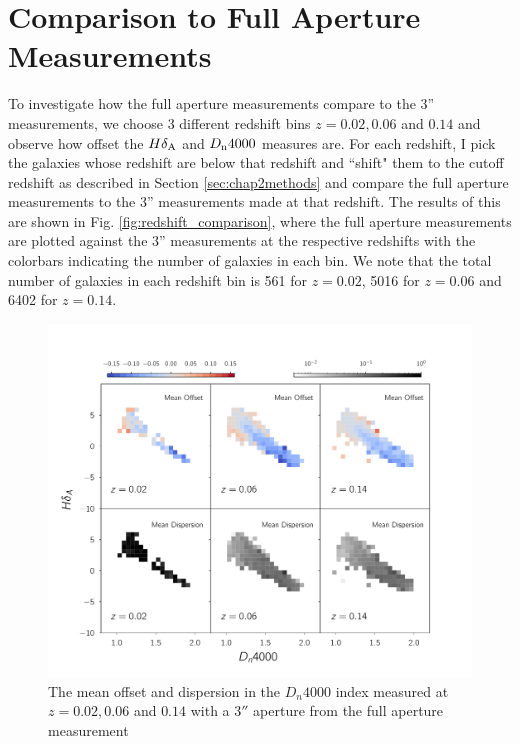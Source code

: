 \section{Comparison to Full Aperture Measurements}
To investigate how the full aperture measurements compare to the 3'' measurements, we choose 3 different redshift bins $z = 0.02,0.06$ and $0.14$ and observe how offset the $H\delta_{\rm A}$ and $D_{\rm n}4000$ measures are. For each redshift, I pick the galaxies whose redshift are below that redshift and ``shift" them to the cutoff redshift as described in Section \ref{sec:chap2methods} and compare the full aperture measurements to the 3'' measurements made at that redshift. The results of this are shown in Fig. \ref{fig:redshift_comparison}, where the full aperture measurements are plotted against the 3'' measurements at the respective redshifts with the colorbars indicating the number of galaxies in each bin. We note that the total number of galaxies in each redshift bin is 561 for $z = 0.02$, 5016 for $z = 0.06$ and 6402 for $z = 0.14$.\\

\begin{figure}
\includegraphics[width=\textwidth]{figures/dn4000_full_aperture_comparisons.pdf}
\caption[The mean offset and dispersion in the $D_{n}4000$ index measured at $z = 0.02,0.06$ and $0.14$ with a $3''$ aperture from the full aperture measurement]{ The mean offset and dispersion in the $D_{n}4000$ index measured at $z = 0.02,0.06$ and $0.14$ with a $3''$ aperture from the full aperture measurement
\label{fig:offset_d4000}}
\end{figure}

